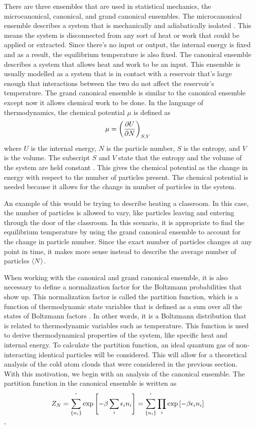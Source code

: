 There are three ensembles that are used in statistical mechanics, the microcanonical, canonical, and grand canonical ensembles. The microcanonical ensemble describes a system that is mechanically and adiabatically isolated \cite{Kardar}. This means the system is disconnected from any sort of heat or work that could be applied or extracted. Since there's no input or output, the internal energy is fixed and as a result, the equilibrium temperature is also fixed. 
The canonical ensemble describes a system that allows heat and work to be an input. This ensemble is usually modelled as a system that is in contact with a reservoir that's large enough  that interactions between the two do not affect the reservoir's temperature. 
The grand canonical ensemble is similar to the canonical ensemble except now it allows chemical work to be done. In the language of thermodynamics, the chemical potential $\mu$ is defined as 
\begin{equation*}
    \mu=\qty(\frac{\partial U}{\partial N})_{S,V}
\end{equation*}
where $U$ is the internal energy, $N$ is the particle number, $S$ is the entropy, and $V$ is the volume. The subscript $S$ and $V$ state that the entropy and the volume of the system are held constant \cite{Blundell}. This gives the chemical potential as the change in energy with respect to the number of particles present. The chemical potential is needed because it allows for the change in number of particles in the system. 

An example of this would be trying to describe heating a classroom. In this case, the number of particles is allowed to vary, like particles leaving and entering through the door of the classroom. In this scenario, it is appropriate to find the equilibrium temperature by using the grand canonical ensemble to account for the change in particle number. Since the exact number of particles changes at any point in time, it makes more sense instead to describe the average number of particles $\left<{N}\right>$. 

When working with the canonical and grand canonical ensemble, it is also necessary to 
define a normalization factor for the Boltzmann probabilities that show up. This normalization factor is called the partition function, which is a function of thermodynamic state variables that is defined as a sum over all the states of Boltzmann factors \cite{Blundell}. In other words, it is a Boltzmann distribution that is related to thermodynamic variables such as temperature. This function is used to derive thermodynamical properties of the system, like specific heat and internal energy. 
To calculate the partition function, an ideal quantum gas of non-interacting identical particles will be considered. This will allow for a theoretical analysis of the cold atom clouds that were considered in the previous section. With this motivation, we begin with an analysis of the canonical ensemble. The partition function in the canonical ensemble is written as
\begin{equation}
    Z_N=\sum_{\{n_i\}}^{'} \exp\qty[-\beta\sum_{i} \epsilon_i n_i]=\sum_{\{n_i\}}^{'} \prod_i \exp\qty[-\beta\epsilon_i n_i]
\end{equation}
'




